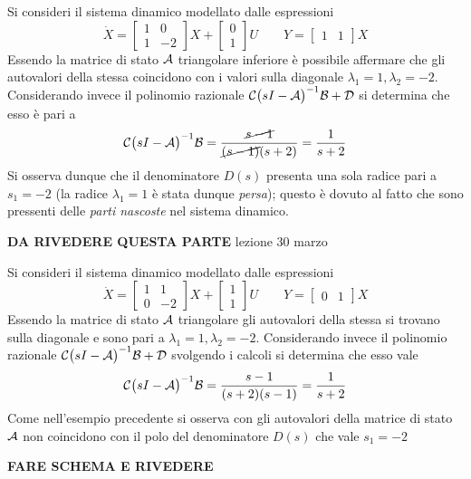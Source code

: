 		\begin{esempio}{}
			Si consideri il sistema dinamico modellato dalle espressioni
			\[ \dot X = \begin{bmatrix}
				1 & 0 \\ 1& -2 
			\end{bmatrix} X + \begin{bmatrix}
				0 \\ 1 
			\end{bmatrix} U \qquad Y = \begin{bmatrix}
				1 & 1 
			\end{bmatrix} X  \]
			Essendo la matrice di stato $\mathcal A$ triangolare inferiore è possibile affermare che gli autovalori della stessa coincidono con i valori sulla diagonale $\lambda_1=1,\lambda_2 = -2$. Considerando invece il polinomio razionale $\mathcal C\big(sI- \mathcal A\big)^{-1}\mathcal B + \mathcal D$ si determina che esso è pari a 
			\[\mathcal C\big(sI- \mathcal A\big)^{-1}\mathcal B = \frac{\cancel{s-1}}{\cancel{(s-1)}(s+2)} = \frac 1 {s+2}\]
			Si osserva dunque che il denominatore $D(s)$ presenta una sola radice pari a $s_1 = -2$ (la radice $\lambda_1=1$ è stata dunque \textit{persa}); questo è dovuto al fatto che sono pressenti delle \textit{parti nascoste} nel sistema dinamico.
			
			\textbf{DA RIVEDERE QUESTA PARTE} lezione 30 marzo
		\end{esempio}
	
		\begin{esempio}{}
			Si consideri il sistema dinamico modellato dalle espressioni
			\[ \dot X = \begin{bmatrix}
				1 & 1 \\ 0& -2 
			\end{bmatrix} X + \begin{bmatrix}
				1 \\ 1 
			\end{bmatrix} U \qquad Y = \begin{bmatrix}
				0 & 1 
			\end{bmatrix} X  \]
			Essendo la matrice di stato $\mathcal A$ triangolare gli autovalori della stessa si trovano sulla diagonale e sono pari a $\lambda_1=1,\lambda_2 = -2$. Considerando invece il polinomio razionale $\mathcal C\big(sI- \mathcal A\big)^{-1}\mathcal B + \mathcal D$ svolgendo i calcoli si determina che esso vale
			\[\mathcal C\big(sI- \mathcal A\big)^{-1}\mathcal B = \frac{s-1}{(s+2)(s-1)} = \frac 1 {s+2}\]
			Come nell'esempio precedente si osserva con gli autovalori della matrice di stato $\mathcal A$ non coincidono con il polo del denominatore $D(s)$ che vale $s_1 = -2$
			
			\textbf{FARE SCHEMA E RIVEDERE}
		\end{esempio}
		
